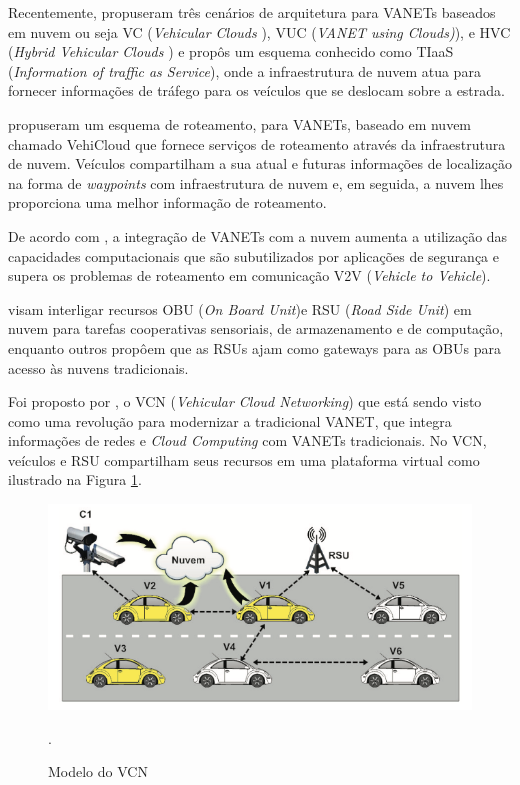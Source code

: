 \documentclass[
	12pt,				%
	oneside,			%
	a4paper,			%
	english,			%
	brazil				%
	]{abntex2ppgsi}
\begin{document}
Recentemente,  propuseram três cenários de arquitetura para VANETs baseados em nuvem ou seja VC (\textit{Vehicular Clouds }), VUC (\textit{VANET using Clouds)}), e HVC (\textit{Hybrid Vehicular Clouds }) e propôs um esquema conhecido como TIaaS (\textit{Information of traffic as Service}), onde a infraestrutura de nuvem atua para fornecer informações de tráfego para os veículos que se deslocam sobre a estrada.

  propuseram um esquema de roteamento, para VANETs, baseado em nuvem chamado VehiCloud que fornece serviços de roteamento através da infraestrutura de nuvem. Veículos compartilham a sua atual e futuras informações de localização na forma de \textit{waypoints} com infraestrutura de nuvem e, em seguida, a nuvem lhes proporciona uma melhor informação de roteamento.

De acordo com , a integração de VANETs com a nuvem aumenta a utilização das capacidades computacionais que são subutilizados por aplicações de segurança e supera os problemas de roteamento em comunicação V2V (\textit{Vehicle to Vehicle}).

 visam interligar recursos OBU (\textit{On Board Unit})e RSU (\textit{Road Side Unit}) em nuvem para tarefas cooperativas sensoriais, de armazenamento e de computação, enquanto outros \cite{hussain2012rethinking} \cite{mershad2013finding} propôem que as RSUs ajam como gateways para as OBUs para acesso às nuvens tradicionais.

Foi proposto por , o VCN (\textit{Vehicular Cloud Networking}) que está sendo visto como uma revolução para modernizar a tradicional VANET, que integra informações de redes e \textit{Cloud Computing} com VANETs tradicionais. No VCN, veículos e  RSU compartilham seus recursos em uma plataforma virtual como ilustrado na Figura \ref{fig:vcn}.

\begin{figure}[h!]
	\centering
	\includegraphics[width=0.7\columnwidth]{images/vcn.png}
	\caption{Modelo do VCN \cite{lee2014vehicular}}.
	\label{fig:vcn}
\end{figure}
\end{document}
